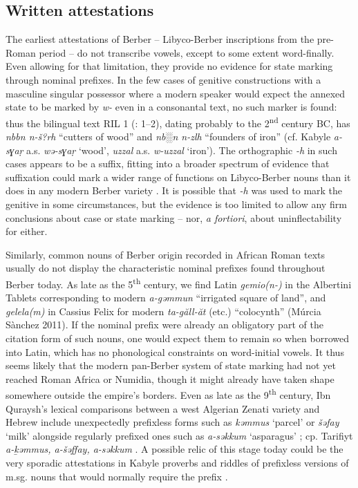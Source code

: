 \documentclass[output=paper]{langscibook}
\begin{document}
\subsection{Written attestations} %
\begin{styleStandarduser}
The earliest attestations of Berber – Libyco-Berber inscriptions from the pre-Roman period – do not transcribe vowels, except to some extent word-finally. Even allowing for that limitation, they provide no evidence for state marking through nominal prefixes. In the few cases of genitive constructions with a masculine singular possessor where a modern speaker would expect the annexed state to be marked by \textit{w-} even in a consonantal text, no such marker is found: thus the bilingual text RIL 1 (\citealt{Chabot1940}: 1–2), dating probably to the 2\textsuperscript{nd} century BC, has \textit{nbbn n-š?rh} “cutters of wood” and \textit{nb░n n-zlh} “founders of iron” (cf. Kabyle \textit{a-sɣaṛ} a.s. \textit{wə-sɣaṛ} ‘wood’, \textit{uzzal} a.s. \textit{w-uzzal} ‘iron’). The orthographic \textit{{}-h} in such cases appears to be a suffix, fitting into a broader spectrum of evidence that suffixation could mark a wider range of functions on Libyco-Berber nouns than it does in any modern Berber variety \citep{Putten2017}. It is possible that \textit{-h} was used to mark the genitive in some circumstances, but the evidence is too limited to allow any firm conclusions about case or state marking – nor, \textit{a fortiori}, about uninflectability for either.
\end{styleStandarduser}

\begin{styleStandarduser}
Similarly, common nouns of Berber origin recorded in African Roman texts usually do not display the characteristic nominal prefixes found throughout Berber today. As late as the 5\textsuperscript{th} century, we find Latin \textit{gemio(n-)} in the Albertini Tablets corresponding to modern \textit{a-gəmmun} “irrigated square of land”, and \textit{gelela(m)} in Cassius Felix for modern \textit{ta-găll-ăt} (etc.) “colocynth” (Múrcia Sànchez 2011). If the nominal prefix were already an obligatory part of the citation form of such nouns, one would expect them to remain so when borrowed into Latin, which has no phonological constraints on word-initial vowels. It thus seems likely that the modern pan-Berber system of state marking had not yet reached Roman Africa or Numidia, though it might already have taken shape somewhere outside the empire’s borders. Even as late as the 9\textsuperscript{th} century, Ibn Quraysh’s lexical comparisons between a west Algerian Zenati variety and Hebrew include unexpectedly prefixless forms such as \textit{kəmmus} ‘parcel’ or \textit{šəfay} ‘milk’ alongside regularly prefixed ones such as \textit{a-səkkum} ‘asparagus’ \citep{Cohen1972}; cp. Tarifiyt \textit{a-ḵəmmus, a-šəffay, a-səkkum} \citep{Abarrou2023}. A possible relic of this stage today could be the very sporadic attestations in Kabyle proverbs and riddles of prefixless versions of m.sg. nouns that would normally require the prefix \citep[58]{Brugnatelli2006}.
\end{styleStandarduser}
\end{document}
